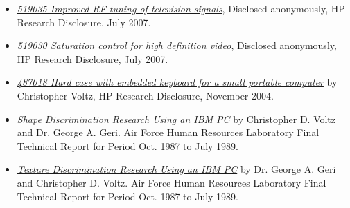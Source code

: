 \documentclass[10pt,letterpaper,oneside]{report}
\begin{document}
\begin{itemize}
  \item \href{http://voltz.us/resume/RD519035.pdf}
    {\textit{519035 Improved RF tuning of television signals}}, Disclosed
    anonymously, HP Research Disclosure, July 2007.

  \item \href{http://voltz.us/resume/RD519030.pdf}
    {\textit{519030 Saturation control for high definition video}}, Disclosed
    anonymously, HP Research Disclosure, July 2007.

  \item \href{http://voltz.us/resume/RD487018.pdf}
    {\textit{487018 Hard case with embedded keyboard for a small portable
    computer}} by Christopher Voltz, HP Research Disclosure, November 2004.

  \item \href{http://voltz.us/resume/ADA219993}
    {\textit{Shape Discrimination Research Using an IBM PC}} by Christopher D.
    Voltz and Dr.  George A. Geri. Air Force Human Resources Laboratory Final
    Technical Report for Period Oct. 1987 to July 1989.

  \item \href{http://voltz.us/resume/ADA224347}
    {\textit{Texture Discrimination Research Using an IBM PC}} by Dr. George A.
    Geri and Christopher D. Voltz. Air Force Human Resources Laboratory Final
    Technical Report for Period Oct. 1987 to July 1989.
\end{itemize}
\end{document}
